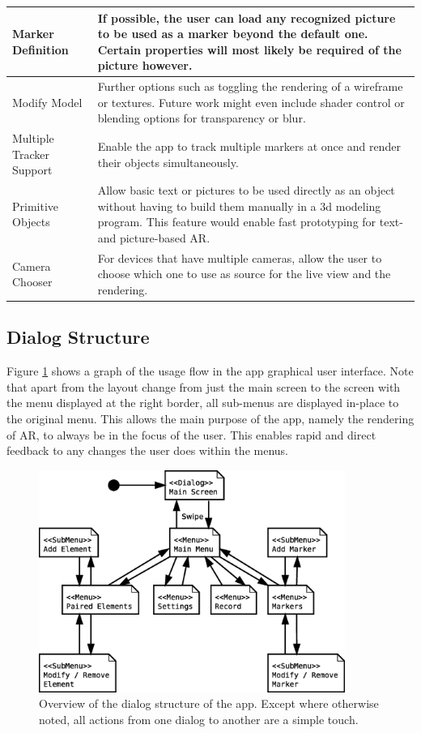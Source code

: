 \begin{tabulary}{\textwidth}{L || L}
Marker Definition & If possible, the user can load any recognized picture to be used as a marker beyond the default one. Certain properties will most likely be required of the picture however. \\
\hline
Modify Model & Further options such as toggling the rendering of a wireframe or textures. Future work might even include shader control or blending options for transparency or blur.\\
\hline
Multiple Tracker Support & Enable the app to track multiple markers at once and render their objects simultaneously.\\
\hline
Primitive Objects & Allow basic text or pictures to be used directly as an object without having to build them manually in a 3d modeling program. This feature would enable fast prototyping for text- and picture-based AR.\\
\hline
Camera Chooser & For devices that have multiple cameras, allow the user to choose which one to use as source for the live view and the rendering.\\
\end{tabulary}

\subsection{Dialog Structure}

Figure \ref{fig:dialog_structure} shows a graph of the usage flow in the app graphical user interface.
Note that apart from the layout change from just the main screen to the screen with the menu displayed at the right border, all sub-menus are displayed in-place to the original menu.
This allows the main purpose of the app, namely the rendering of AR, to always be in the focus of the user.
This enables rapid and direct feedback to any changes the user does within the menus.

\begin{figure}
	\centering
	\includegraphics[width=10cm]{images/dialogs.eps}
	\caption[App Dialog Structure.]{Overview of the dialog structure of the app. Except where otherwise noted, all actions from one dialog to another are a simple touch.}
	\label{fig:dialog_structure}
\end{figure}

